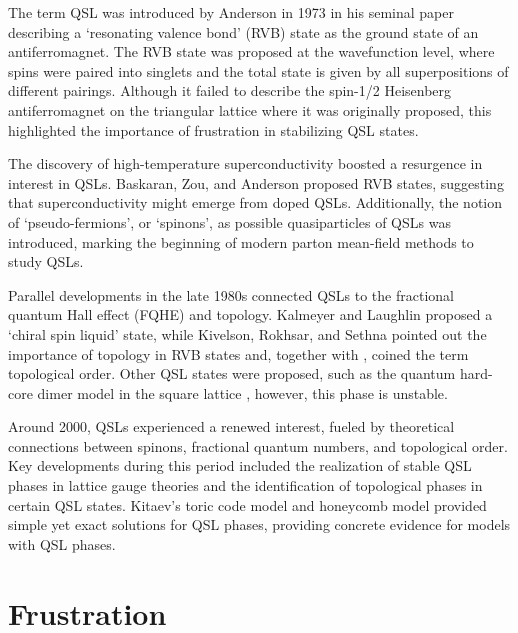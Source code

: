 The term  QSL was introduced by Anderson in 1973 in his seminal paper \cite{Anderson1973} describing a `resonating valence bond' (RVB) state as the ground state of an antiferromagnet. The RVB state was proposed at the wavefunction level, where spins were paired into singlets and the total state is given by all superpositions of different pairings. Although it failed to describe the spin-1/2 Heisenberg antiferromagnet on the triangular lattice where it was originally proposed, this highlighted the importance of frustration in stabilizing QSL states.

The discovery of high-temperature superconductivity boosted a resurgence in interest in QSLs. Baskaran,  Zou, and Anderson \cite{Baskaran1987,Anderson1987} proposed RVB states, suggesting that superconductivity might emerge from doped QSLs. Additionally, the notion of `pseudo-fermions', or `spinons', as possible quasiparticles of QSLs was introduced, marking the beginning of modern parton mean-field methods to study QSLs.


Parallel developments in the late 1980s connected QSLs to the fractional quantum Hall effect (FQHE) and topology. Kalmeyer and Laughlin proposed a `chiral spin liquid' state, while Kivelson, Rokhsar, and Sethna \cite{Kivelson1987} pointed out the importance of topology in RVB states and, together with \cite{Wen1990}, coined the term topological order. Other QSL states were proposed, such as the quantum hard-core dimer model in the square lattice \cite{Rokhsar1988}, however, this phase is unstable.


Around 2000, QSLs experienced a renewed interest, fueled by theoretical connections between spinons, fractional quantum numbers, and topological order.
Key developments during this period included the realization of stable QSL phases in lattice gauge theories and the identification of topological phases in certain QSL states. Kitaev's toric \cite{Kitaev2003} code model and honeycomb model provided simple yet exact solutions for QSL phases, providing concrete evidence for models with QSL phases.

\clearpage

\section*{Frustration}

